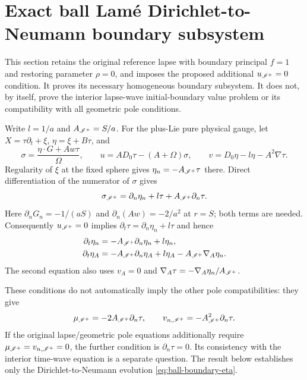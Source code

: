 \section{Exact ball Lam\'e Dirichlet-to-Neumann boundary subsystem}
\label{sec:boundary-gauge-dn}

This section retains the original reference lapse with boundary principal
$f=1$ and restoring parameter $\rho=0$, and imposes the proposed additional
$u_{\mathscr I^+}=0$ condition. It proves its necessary homogeneous boundary
subsystem. It does not, by itself, prove the interior lapse-wave
initial-boundary value problem or its compatibility with all geometric pole
conditions.

Write $l=1/a$ and $A_{\mathscr I^+}=S/a$. For the plus-Lie pure physical gauge,
let $X=\tau\partial_t+\xi$, $\eta=\xi+B\tau$, and
\[
 \sigma=\frac{\eta\cdot G+Aw\tau}\Omega,
 \qquad u=A D_0\tau-(A+\Omega)\sigma,
 \qquad v=D_0\eta-l\eta-A^2\nabla\tau.
\]
Regularity of $\xi$ at the fixed sphere gives
$\eta_n=-A_{\mathscr I^+}\tau$ there. Direct differentiation of the numerator of
$\sigma$ gives
\[
 \sigma_{\mathscr I^+}=\partial_n\eta_n+l\tau+A_{\mathscr I^+}\partial_n\tau.
\]
Here $\partial_nG_n=-1/(aS)$ and
$\partial_n(Aw)=-2/a^2$ at $r=S$; both terms are needed.
Consequently $u_{\mathscr I^+}=0$ implies
$\partial_t\tau=\partial_n\eta_n+l\tau$ and hence
\begin{align}
 \partial_t\eta_n&=-A_{\mathscr I^+}\partial_n\eta_n+l\eta_n,\\
 \partial_t\eta_A&=-A_{\mathscr I^+}\partial_n\eta_A+l\eta_A
                         -A_{\mathscr I^+}\nabla_A\eta_n.
 \label{eq:ball-boundary-eta}
\end{align}
The second equation also uses $v_A=0$ and
$\nabla_A\tau=-\nabla_A\eta_n/A_{\mathscr I^+}$.

These conditions do not automatically imply the other pole compatibilities:
they give
\[
 \mu_{\mathscr I^+}=-2A_{\mathscr I^+}\partial_n\tau,
 \qquad v_{n,\mathscr I^+}=-A_{\mathscr I^+}^2\partial_n\tau.
\]
If the original lapse/geometric pole equations additionally require
$\mu_{\mathscr I^+}=v_{n,\mathscr I^+}=0$, the further condition is
$\partial_n\tau=0$. Its consistency with the interior time-wave equation
is a separate question. The result below establishes only the
Dirichlet-to-Neumann evolution \eqref{eq:ball-boundary-eta}.

